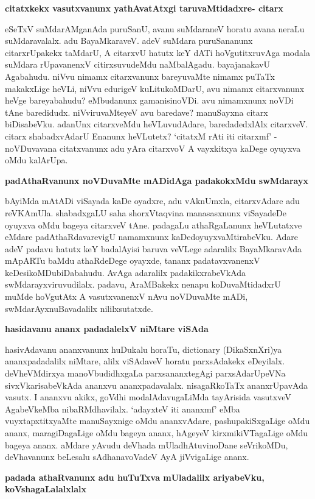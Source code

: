 {\bf citatxkekx vasutxvanunx yathAvatAtxgi taruvaMtidadxre- citarx}

eSeTxV suMdarAMganAda puruSanU, avanu suMdaraneV horatu avana neraLu suMdaravalalx. adu BayaMkaraveV. adeV suMdara puruSananunx citarxrUpakekx taMdarU, A citarxvU hatutx keY dATi hoVgutitxruvAga modala suMdara rUpavanenxV citirxsuvudeMdu naMbalAgadu. bayajanakavU Agabahudu. niVvu nimamx citarxvanunx bareyuvaMte nimamx puTaTx makakxLige heVLi, niVvu edurigeV kuLitukoMDarU, avu nimamx citarxvanunx heVge bareyabahudu? eMbudanunx gamanisinoVDi. avu nimamxnunx noVDi tAne baredidudx. niVviruvaMteyeV avu baredave? manuSayxna citarx biDisabeVku. adanUnx citarxveMdu heVLuvudAdare, baredadedxlAlx citarxveV. citarx shabadxvAdarU Enanunx heVLutetx? `citatxM rAti iti citarxmf' - noVDuvavana citatxvanunx adu yAra citarxvoV A vayxkitxya kaDege oyuyxva oMdu kalArUpa.

{\bf padAthaRvanunx noVDuvaMte mADidAga padakokxMdu swMdarayx}

bAyiMda mAtADi viSayada kaDe oyadxre, adu vAknUmxla, citarxvAdare adu reVKAmUla. shabadxgaLU saha shorxVtaqvina manasasxnunx viSayadeDe oyuyxva oMdu bageya citarxveV tAne. padagaLu athaRgaLanunx heVLutatxve eMdare padAthaRdavarevigU namamxnunx kaDedoyuyxvaMtirabeVku. Adare adeV padavu hatutx keY badalAyisi baruva veVLege adaralilx BayaMkaravAda mApARTu baMdu athaRdeDege oyayxde, tananx padatavxvanenxV keDesikoMDubiDabahudu. AvAga adaralilx padakikxrabeVkAda swMdarayxviruvudilalx. padavu, AraMBakekx nenapu koDuvaMtidadxrU muMde hoVgutAtx A vasutxvanenxV nAvu noVDuvaMte mADi, swMdarAyxnuBavadalilx nililxsutatxde.

{\bf hasidavanu ananx padadalelxV niMtare viSAda}

hasivAdavanu ananxvanunx huDukalu horaTu, {\rm dictionary} (DikaSxnXri)ya ananxpadadalilx niMtare, alilx viSAdaveV horatu parxsAdakekx eDeyilalx. deVheVMdirxya manoVbudidhxgaLa parxsananxtegAgi parxsAdarUpeVNa sivxVkarisabeVkAda ananxvu ananxpadavalalx. nisagaRkoTaTx ananxrUpavAda vasutx. I ananxvu akikx, goVdhi modalAdavugaLiMda tayArisida vasutxveV AgabeVkeMba nibaRMdhavilalx. `adayxteV iti ananxmf' eMba vuyxtapxtitxyaMte manuSayxnige oMdu ananxvAdare, pashupakiSxgaLige oMdu ananx, maragiDagaLige oMdu bageya ananx, hAgeyeV kirxmikiVTagaLige oMdu bageya ananx. aMdare yAvudu deVhada mUladhAtuvinoDane seVrikoMDu, deVhavanunx beLesalu sAdhanavoVadeV AyA jiVvigaLige ananx.

{\bf padada athaRvanunx adu huTuTxva mUladalilx ariyabeVku, koVshagaLalalxlalx}

